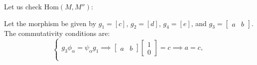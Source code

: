 \documentclass[11pt, a4paper]{report}
\begin{document}
\begin{example}
Let us check $ \mathrm{Hom}(M,M'') $:
\begin{center}
\end{center}
Let the morphism be given by $g_1 = [c]$, $g_2 = [d]$, $g_4 = [e]$, and $g_3 = \begin{bmatrix} a & b \end{bmatrix}$. The commutativity conditions are:
\[
\begin{cases}
g_3 \phi_\alpha = \psi_\alpha g_1 \implies \begin{bmatrix} a & b \end{bmatrix} \begin{bmatrix} 1 \\ 0 \end{bmatrix} = c \implies a = c, \\

\end{cases}\]
\end{example}
\end{document}
